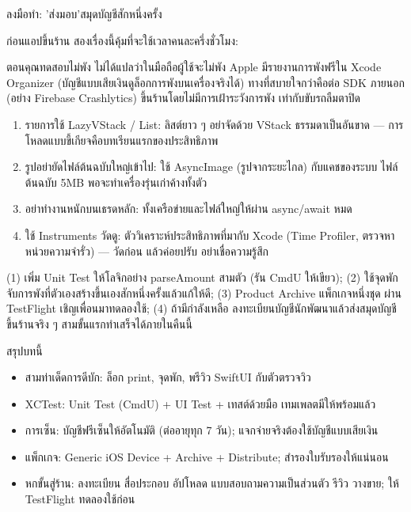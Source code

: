 \begin{tcbpractice}{ลงมือทำ: 'ส่งมอบ'สมุดบัญชีสักหนึ่งครั้ง}

ก่อนแอปขึ้นร้าน สองเรื่องนี้คุ้มที่จะใช้เวลาคนละครึ่งชั่วโมง:


ตอนคุณทดสอบไม่พัง ไม่ได้แปลว่าในมือถือผู้ใช้จะไม่พัง Apple มีรายงานการพังฟรีใน Xcode Organizer (บัญชีแบบเสียเงินดูล็อกการพังบนเครื่องจริงได้) ทางที่สบายใจกว่าคือต่อ SDK ภายนอก (อย่าง Firebase Crashlytics) ขึ้นร้านโดยไม่มีการเฝ้าระวังการพัง เท่ากับขับรถลืมตาปิด


\begin{enumerate}
  \item รายการใช้ LazyVStack / List: ลิสต์ยาว ๆ อย่าจัดด้วย VStack ธรรมดาเป็นอันขาด — การโหลดแบบขี้เกียจคือบทเรียนแรกของประสิทธิภาพ
  \item รูปอย่ายัดไฟล์ต้นฉบับใหญ่เข้าไป: ใช้ AsyncImage (รูปจากระยะไกล) กับแคชของระบบ ไฟล์ต้นฉบับ 5MB พอจะทำเครื่องรุ่นเก่าค้างทั้งตัว
  \item อย่าทำงานหนักบนเธรดหลัก: ทั้งเครือข่ายและไฟล์ใหญ่ให้ผ่าน async/await หมด
  \item ใช้ Instruments วัดดู: ตัววิเคราะห์ประสิทธิภาพที่มากับ Xcode (Time Profiler, ตรวจหาหน่วยความจำรั่ว) — วัดก่อน แล้วค่อยปรับ อย่าเชื่อความรู้สึก
\end{enumerate}

(1) เพิ่ม Unit Test ให้โลจิกอย่าง parseAmount สามตัว (รัน CmdU ให้เขียว); (2) ใช้จุดพักจับการพังที่ตัวเองสร้างขึ้นเองสักหนึ่งครั้งแล้วแก้ให้ดี; (3) Product Archive แพ็กเกจหนึ่งชุด ผ่าน TestFlight เชิญเพื่อนมาทดลองใช้; (4) ถ้ามีกำลังเหลือ ลงทะเบียนบัญชีนักพัฒนาแล้วส่งสมุดบัญชีขึ้นร้านจริง ๆ สามขั้นแรกทำเสร็จได้ภายในคืนนี้

\end{tcbpractice}

\begin{tcbsummary}{สรุปบทนี้}
\begin{itemize}
  \item สามท่าเด็ดการดีบัก: ล็อก print, จุดพัก, พรีวิว SwiftUI กับตัวตรวจวิว
  \item XCTest: Unit Test (CmdU) + UI Test + เทสต์ด้วยมือ เทมเพลตมีให้พร้อมแล้ว
  \item การเซ็น: บัญชีฟรีเซ็นให้อัตโนมัติ (ต่ออายุทุก 7 วัน); แจกจ่ายจริงต้องใช้บัญชีแบบเสียเงิน
  \item แพ็กเกจ: Generic iOS Device + Archive + Distribute; สำรองใบรับรองให้แน่นอน
  \item หกขั้นสู่ร้าน: ลงทะเบียน สื่อประกอบ อัปโหลด แบบสอบถามความเป็นส่วนตัว รีวิว วางขาย; ให้ TestFlight ทดลองใช้ก่อน
\end{itemize}

\end{tcbsummary}
